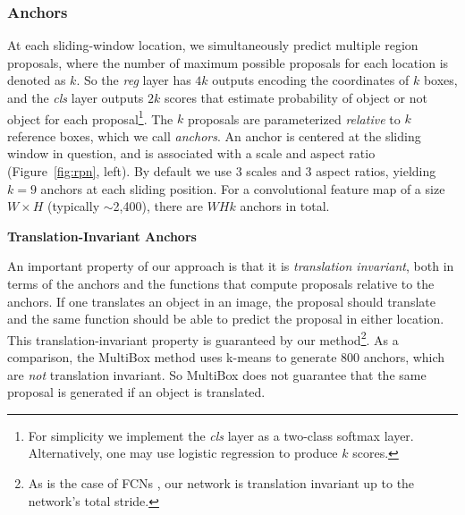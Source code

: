 \documentclass[10pt,journal,cspaper,compsoc]{IEEEtran}
\begin{document}

\subsubsection{Anchors}

At each sliding-window location, we simultaneously predict multiple region proposals, where the number of maximum possible proposals for each location is denoted as $k$.
So the \emph{reg} layer has $4k$ outputs encoding the coordinates of $k$ boxes, and the \emph{cls} layer outputs $2k$ scores that estimate probability of object or not object for each proposal\footnote{For simplicity we implement the \emph{cls} layer as a two-class softmax layer. Alternatively, one may use logistic regression to produce $k$ scores.}. The $k$ proposals are parameterized \emph{relative} to $k$ reference boxes, which we call \emph{anchors}. An anchor is centered at the sliding window in question, and is associated with a scale and aspect ratio (Figure~\ref{fig:rpn}, left). By default we use 3 scales and 3 aspect ratios, yielding $k=9$ anchors at each sliding position. For a convolutional feature map of a size $W \times H$ (typically $\sim$2,400), there are $WHk$ anchors in total.

\vspace{.5em}
\noindent\textbf{Translation-Invariant Anchors}

An important property of our approach is that it is \emph{translation invariant}, both in terms of the anchors and the functions that compute proposals relative to the anchors.
If one translates an object in an image, the proposal should translate and the same function should be able to predict the proposal in either location. This translation-invariant property is guaranteed by our method\footnote{As is the case of FCNs \cite{Long2015}, our network is translation invariant up to the network's total stride.}.
As a comparison, the MultiBox method \cite{Szegedy2014a} uses k-means to generate 800 anchors, which are \emph{not} translation invariant. So MultiBox does not guarantee that the same proposal is generated if an object is translated.
\end{document}
